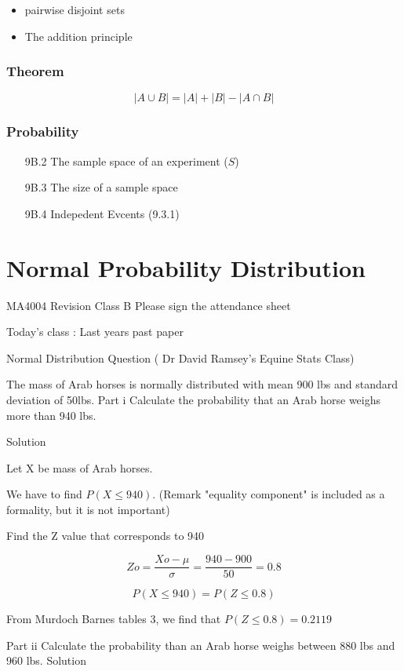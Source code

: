 \documentclass[12pt]{report}
\begin{document}
\begin{itemize}
	\item pairwise disjoint sets
	\item The addition principle
\end{itemize}
\subsection*{Theorem}
\[ |A \cup B| = |A| + |B| - |A \cap B|  \]

\subsection*{Probability}
\begin{itemize}
	\item[9B.2] The sample space of an experiment ($S$)
	\item[9B.3] The size of a sample space
	\item[9B.4] Indepedent Evcents (9.3.1)
\end{itemize}

\chapter{Normal Probability Distribution}
MA4004 Revision Class B
Please sign the attendance sheet

Today's class : Last years past paper 


Normal Distribution Question ( Dr David Ramsey's Equine Stats Class)

The mass of Arab horses is normally distributed with mean 900 lbs and standard deviation of 50lbs.
Part i Calculate the probability that an Arab horse weighs more than 940 lbs.


Solution

Let X be mass of Arab horses.

We have to find $P(X\leq940)$.            (Remark "equality component" is included as a formality, but it is not important)


Find the Z value that corresponds to 940 

\[Zo=\frac{Xo-\mu}{\sigma}= \frac{940 -900}{50}= 0.8\]

\[P(X \leq 940) = P(Z \leq 0.8) \]


From Murdoch Barnes tables 3, we find that $P(Z \leq 0.8) = 0.2119$



Part ii Calculate the probability than an Arab horse weighs between 880 lbs and 960 lbs.
Solution 
\end{document}

